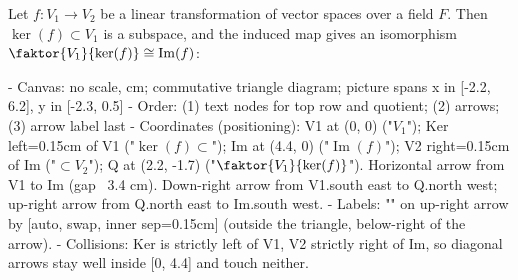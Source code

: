 \begin{content}
Let $f \colon V_1 \to V_2$ be a linear transformation of vector spaces over a field $F$. Then $\ker(f) \subset V_1$ is a subspace, and the induced map gives an isomorphism $\faktor{V_1}{\ker(f)} \cong \operatorname{Im}(f)$:

\begin{hidden}
- Canvas: no scale, cm; commutative triangle diagram; picture spans x in [-2.2, 6.2], y in [-2.3, 0.5]
- Order: (1) text nodes for top row and quotient; (2) arrows; (3) arrow label last
- Coordinates (positioning):
  V1 at (0, 0) ("$V_1$"); Ker left=0.15cm of V1 ("$\ker(f) \subset$");
  Im at (4.4, 0) ("$\operatorname{Im}(f)$"); V2 right=0.15cm of Im ("$\subset V_2$");
  Q at (2.2, -1.7) ("$\faktor{V_1}{\ker(f)}$").
  Horizontal arrow from V1 to Im (gap ~3.4 cm).
  Down-right arrow from V1.south east to Q.north west; up-right arrow from Q.north east to Im.south west.
- Labels: "\cong" on up-right arrow by [auto, swap, inner sep=0.15cm] (outside the triangle, below-right of the arrow).
- Collisions: Ker is strictly left of V1, V2 strictly right of Im, so diagonal arrows stay well inside [0, 4.4] and touch neither.
\end{hidden}
\begin{center}
\end{center}
\end{content}

